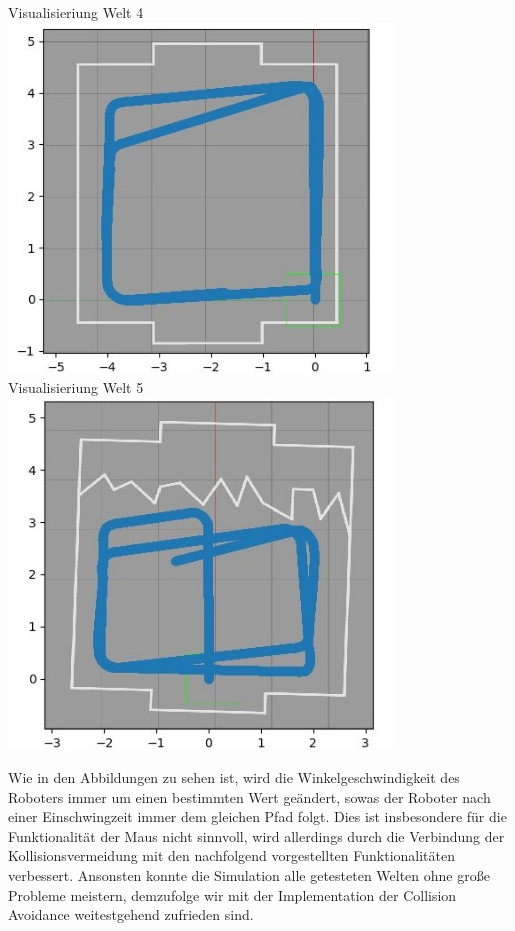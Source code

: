 \documentclass[12pt, a4paper]{report}
\begin{document}
\begin{centering}
Visualisieriung Welt 4\\
\includegraphics[width=290pt]{roboter_pfad4.jpg}\newpage
~\\
Visualisieriung Welt 5\\
\includegraphics[width=290pt]{roboter_pfad5.jpg}\\
\end{centering}

Wie in den Abbildungen zu sehen ist, wird die Winkelgeschwindigkeit des Roboters immer um einen bestimmten Wert geändert, sowas der Roboter nach einer Einschwingzeit immer dem gleichen Pfad folgt. Dies ist insbesondere für die Funktionalität der Maus nicht sinnvoll, wird allerdings durch die Verbindung der Kollisionsvermeidung mit den nachfolgend vorgestellten Funktionalitäten verbessert. Ansonsten konnte die Simulation alle getesteten Welten ohne große Probleme meistern, demzufolge wir mit der Implementation der Collision Avoidance weitestgehend zufrieden sind.
\newline
\end{document}
